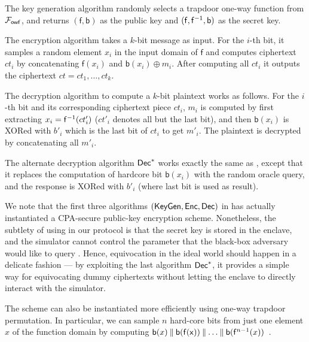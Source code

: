 \begin{cccItemize}[noitemsep]
	\item The key generation \KeyGen algorithm randomly selects a trapdoor one-way function from $\mathcal{F}_{\mathsf{owf}}$, and returns $(\mathsf{f}, \mathsf{b})$ as the public key and $(\mathsf{f}, \mathsf{f}^{-1}, \mathsf{b})$ as the secret key.

	\item The encryption algorithm \Enc takes a $k$-bit message as input.
	      For the $i$-th bit, it samples a random element $x_i$ in the input domain of $\mathsf{f}$ and computes ciphertext $ct_i$ by concatenating $\mathsf{f}(x_i)$ and $\mathsf{b}(x_i) \oplus m_i$.
	      After computing all $ct_i$ it outputs the ciphertext $ct = ct_1, \ldots, ct_k$.

	\item The decryption algorithm \Dec to compute a $k$-bit plaintext works as follows.
	      For the $i$-th bit and its corresponding ciphertext piece $ct_i$, $m_i$ is computed by first extracting $x_i = \mathsf{f}^{-1}(ct'_i)$ ($ct'_i$ denotes all but the last bit), and then $\mathsf{b}(x_i)$ is XORed with $b'_i$ which is the last bit of $ct_i$ to get $m'_i$.
	      The plaintext is decrypted by concatenating all $m'_i$.

	\item The alternate decryption algorithm $\mathsf{Dec}^*$ works exactly the same as \Dec, except that it replaces the computation of hardcore bit $\mathsf{b}(x_i)$ with the random oracle query, and the response is XORed with $b'_i$ (where last bit is used as result).
\end{cccItemize}



We note that the first three algorithms $(\mathsf{KeyGen}, \mathsf{Enc}, \mathsf{Dec})$ in \PKE has actually instantiated a CPA-secure public-key encryption scheme.
%
Nonetheless, the subtlety of using \PKE in our protocol is that the secret key is stored in the enclave, and the simulator cannot control the parameter that the black-box adversary would like to query \funcEnclave.
%
Hence, equivocation in the ideal world should happen in a delicate fashion --- by exploiting the last algorithm $\mathsf{Dec}^*$, it provides a simple way for equivocating dummy ciphertexts without letting the enclave to directly interact with the simulator.

\begin{remark}
	The \PKE scheme can also be instantiated more efficiently using one-way trapdoor permutation.
	In particular, we can sample $n$ hard-core bits from just one element $x$ of the function domain by computing $\mathsf{b}(x) \mathbin\Vert \mathsf{b}(\mathsf{f(x)}) \mathbin\Vert \dots \mathbin\Vert \mathsf{b}(\mathsf{f}^{n-1}(x))$~\cite{C:KatOst04}.
\end{remark}


